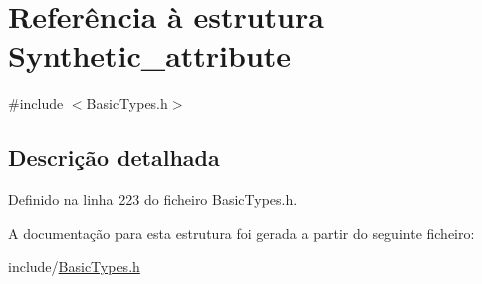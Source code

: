 \hypertarget{structSynthetic__attribute}{}\section{Referência à estrutura Synthetic\+\_\+attribute}
\label{structSynthetic__attribute}


{\ttfamily \#include $<$Basic\+Types.\+h$>$}



\subsection{Descrição detalhada}


Definido na linha 223 do ficheiro Basic\+Types.\+h.



A documentação para esta estrutura foi gerada a partir do seguinte ficheiro\+:\begin{DoxyCompactItemize}
\item 
include/\hyperlink{BasicTypes_8h}{Basic\+Types.\+h}\end{DoxyCompactItemize}
